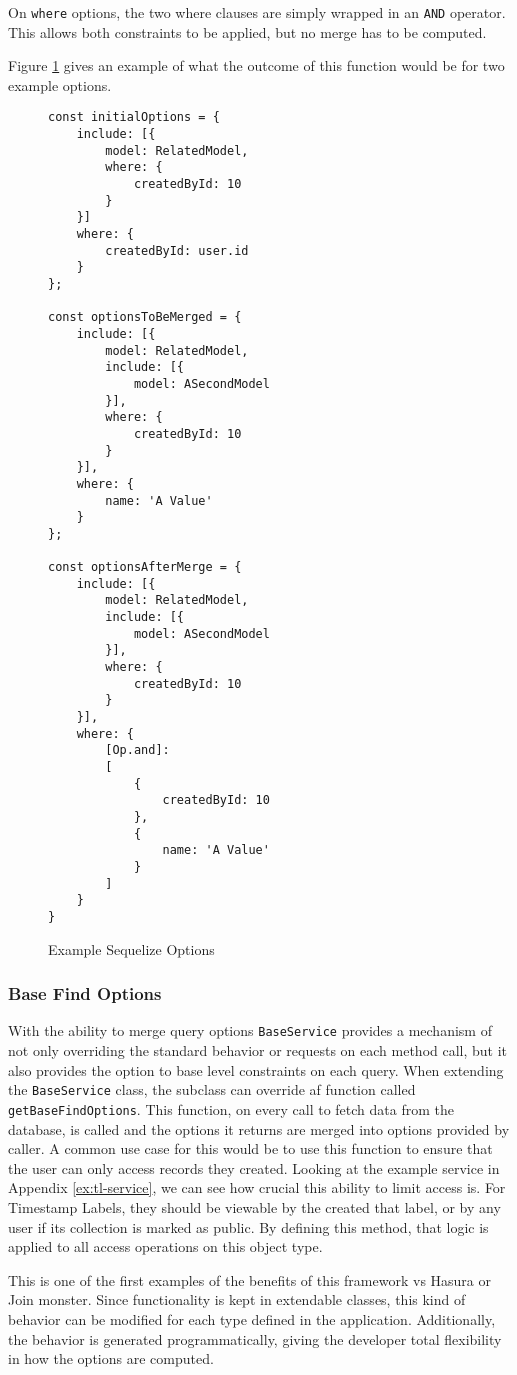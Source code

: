On \verb!where! options, the two where clauses are simply wrapped in an \verb!AND! operator.  This allows both constraints to be applied, but no merge has to be computed.

Figure \ref{fig:merge-options} gives an example of what the outcome of this function would be for two example options.

\begin{figure}
    \label{fig:merge-options}
    \begin{Verbatim}[fontsize=\footnotesize]
const initialOptions = {
    include: [{
        model: RelatedModel,
        where: {
            createdById: 10
        }
    }]
    where: {
        createdById: user.id
    }
};

const optionsToBeMerged = {
    include: [{
        model: RelatedModel,
        include: [{
            model: ASecondModel
        }],
        where: {
            createdById: 10
        }
    }],
    where: {
        name: 'A Value'
    }
};

const optionsAfterMerge = {
    include: [{
        model: RelatedModel,
        include: [{
            model: ASecondModel
        }],
        where: {
            createdById: 10
        }
    }],
    where: {
        [Op.and]: 
        [
            {
                createdById: 10
            },
            {
                name: 'A Value'
            }
        ]
    }
}
    \end{Verbatim}
    \caption{Example Sequelize Options}
\end{figure}

\subsubsection{Base Find Options}
With the ability to merge query options \verb!BaseService! provides a mechanism of not only overriding the standard behavior or requests on each method call, but it also provides the option to base level constraints on each query.  When extending the \verb!BaseService! class, the subclass can override af function called \verb!getBaseFindOptions!.  This function, on every call to fetch data from the database, is called and the options it returns are merged into options provided by caller.  A common use case for this would be to use this function to ensure that the user can only access records they created.  Looking at the example service in Appendix \ref{ex:tl-service}, we can see how crucial this ability to limit access is.  For Timestamp Labels, they should be viewable by the created that label, or by any user if its collection is marked as public.  By defining this method, that logic is applied to all access operations on this object type.  

This is one of the first examples of the benefits of this framework vs Hasura or Join monster.  Since functionality is kept in extendable classes, this kind of behavior can be modified for each type defined in the application.  Additionally, the behavior is generated programmatically, giving the developer total flexibility in how the options are computed.